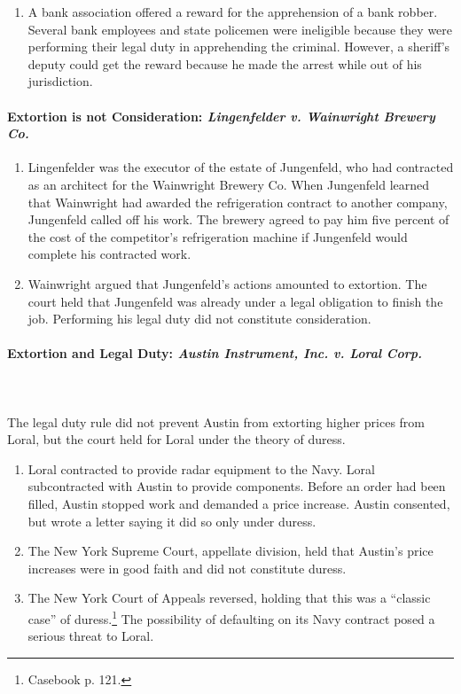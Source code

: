 \begin{enumerate}
    \item A bank association offered a reward for the apprehension of a bank 
    robber. Several bank employees and state policemen were ineligible because 
    they were performing their legal duty in apprehending the criminal. 
    However, a sheriff's deputy could get the reward because he made the 
    arrest while out of his jurisdiction.
\end{enumerate}

\paragraph{Extortion is not Consideration: \emph{Lingenfelder v. Wainwright 
Brewery Co.}}

\begin{enumerate}
    \item Lingenfelder was the executor of the estate of Jungenfeld, who had 
    contracted as an architect for the Wainwright Brewery Co. When Jungenfeld 
    learned that Wainwright had awarded the refrigeration contract to another 
    company, Jungenfeld called off his work. The brewery agreed to pay him 
    five percent of the cost of the competitor's refrigeration machine if 
    Jungenfeld would complete his contracted work.
    \item Wainwright argued that Jungenfeld's actions amounted to extortion. 
    The court held that Jungenfeld was already under a legal obligation to 
    finish the job. Performing his legal duty did not constitute 
    consideration.
\end{enumerate}

\paragraph{Extortion and Legal Duty: \emph{Austin Instrument, Inc. v. Loral 
Corp.}}
~\\\\
The legal duty rule did not prevent Austin from extorting higher prices from Loral, 
but the court held for Loral under the theory of duress.

\begin{enumerate}
    \item Loral contracted to provide radar equipment to the Navy. Loral 
    subcontracted with Austin to provide components. Before an order had been 
    filled, Austin stopped work and demanded a price increase. Austin 
    consented, but wrote a letter saying it did so only under duress.
    \item The New York Supreme Court, appellate division, held that Austin's 
    price increases were in good faith and did not constitute duress.
    \item The New York Court of Appeals reversed, holding that this was a 
    ``classic case'' of duress.\footnote{Casebook p. 121.} The possibility of 
    defaulting on its Navy contract posed a serious threat to Loral. 
\end{enumerate}

